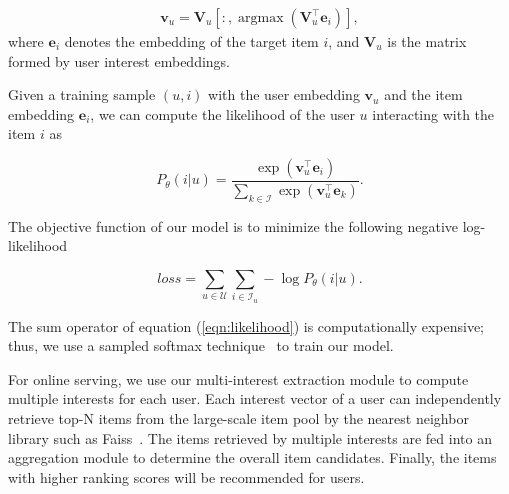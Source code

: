 \begin{equation}
    \label{eqn:argmax}
    \begin{aligned}
        \mathbf{v}_u = \mathbf{V}_u[:, \operatorname{argmax}(\mathbf{V}_u^\top \mathbf{e}_i)],
    \end{aligned}
\end{equation}
where $\mathbf{e}_i$ denotes the embedding of the target item $i$, and $\mathbf{V}_u$ is the matrix formed by user interest embeddings. %

Given a training sample $(u,i)$ with the user embedding $\mathbf{v}_u$ and the item embedding $\mathbf{e}_i$, we can compute the likelihood of the user $u$ interacting with the item $i$ as

\begin{equation}
    \label{eqn:likelihood}
    P_\theta(i|u) = \frac{\exp(\mathbf{v}_u^\top \mathbf{e}_i)}{\sum_{k\in\mathcal{I}}\exp(\mathbf{v}_u^\top \mathbf{e}_k)}.
\end{equation}

The objective function of our model is to minimize the following negative log-likelihood

\begin{equation}
    \label{eqn:loss}
    loss = \sum_{u\in \mathcal{U}} \sum_{i\in \mathcal{I}_u} -\log P_\theta(i|u).
\end{equation}

The sum operator of equation (\ref{eqn:likelihood}) is computationally expensive; thus, we use a sampled softmax technique~\cite{jean2014using, covington2016deep} to train our model.

For online serving, we use our multi-interest extraction module to compute multiple interests for each user. Each interest vector of a user can independently retrieve top-N items from the large-scale item pool by the nearest neighbor library such as Faiss~\cite{JDH17}. The items retrieved by multiple interests are fed into an aggregation module to determine the overall item candidates. Finally, the items with higher ranking scores will be recommended for users.




